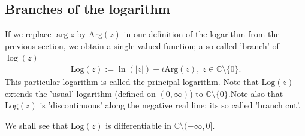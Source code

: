 \documentclass[12pt, a4paper]{article}
\theoremstyle{plain}
\theoremstyle{definition}
\begin{document}
		\subsection{Branches of the logarithm} %
		\label{sub:branches_of_the_logarithm}
			If we replace $\arg{z}$ by $\mathrm{Arg}(z)$ in our definition of the logarithm from the previous section, we obtain a single-valued function; a so called 'branch' of $\log(z)$
			\begin{align*}
				\mathrm{Log}(z):= \ln(|z|)+i \mathrm{Arg}(z),\:z\in\mathbb{C}\setminus\{0\}.
			\end{align*}
			This particular logarithm is called the principal logarithm. Note that $\mathrm{Log}(z)$ extends the 'usual' logarithm (defined on $(0,\infty)$) to $\mathbb{C}\setminus\{0\}$.Note also that $\mathrm{Log}(z)$ is 'discontinuous' along the negative real line; its so called 'branch cut'.

			We shall see that $\mathrm{Log}(z)$ is differentiable in $\mathbb{C}\setminus(-\infty,0]$.
\end{document}
